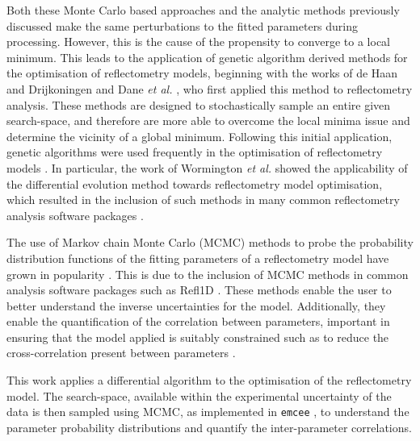 Both these Monte Carlo based approaches and the analytic methods previously discussed make the same perturbations to the fitted parameters during processing.
However, this is the cause of the propensity to converge to a local minimum.
This leads to the application of genetic algorithm derived methods for the optimisation of reflectometry models, beginning with the works of de Haan and Drijkoningen \cite{de_haan_genetic_1994} and Dane \emph{et al.} \cite{dane_application_1998}, who first applied this method to reflectometry analysis.
These methods are designed to stochastically sample an entire given search-space, and therefore are more able to overcome the local minima issue and determine the vicinity of a global minimum.
Following this initial application, genetic algorithms were used frequently in the optimisation of reflectometry models \cite{ulyanenkov_genetic_2000,ulyanenkov_extended_2005,politsch_unbiased_2002,wormington_characterization_1999}.
In particular, the work of Wormington \emph{et al.} \cite{wormington_characterization_1999} showed the applicability of the differential evolution method towards reflectometry model optimisation, which resulted in the inclusion of such methods in many common reflectometry analysis software packages \cite{bjorck_fitting_2011,bjorck_genx_2007,nelson_co-refinement_2006,nelson_refnx_2019,ott_simulreflec_2008,kienzle_ncnr_2006}.

The use of Markov chain Monte Carlo (MCMC) methods to probe the probability distribution functions of the fitting parameters of a reflectometry model have grown in popularity \cite{gil_limitations_2012,hoogerheide_structure_2018,owejan_solid_2012,heinrich_myristoylation_2014}.
This is due to the inclusion of MCMC methods in common analysis software packages such as Refl1D \cite{kienzle_ncnr_2006}.
These methods enable the user to better understand the inverse uncertainties for the model.
Additionally, they enable the quantification of the correlation between parameters, important in ensuring that the model applied is suitably constrained such as to reduce the cross-correlation present between parameters \cite{nelson_co-refinement_2006}.

This work applies a differential algorithm \cite{storn_differential_1997,jones_scipy_2001} to the optimisation of the reflectometry model.
The search-space, available within the experimental uncertainty of the data is then sampled using MCMC, as implemented in \texttt{emcee} \cite{foreman-mackey_emcee_2013}, to understand the parameter probability distributions and quantify the inter-parameter correlations.


